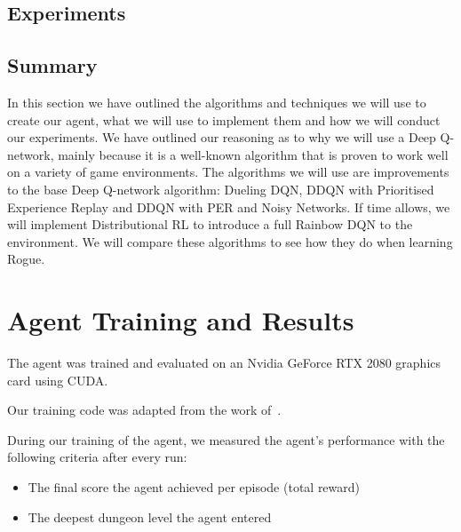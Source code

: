 \documentclass[12pt,a4paper]{article}
\begin{document}
    \subsection{Experiments}\label{subsec:experiments} %


    \subsection{Summary}\label{subsec:summary2}
    In this section we have outlined the algorithms and techniques we will use to create our agent, what we will use to implement them and how we will conduct our experiments.
    We have outlined our reasoning as to why we will use a Deep Q-network, mainly because it is a well-known algorithm that is proven to work well on a variety of game environments.
    The algorithms we will use are improvements to the base Deep Q-network algorithm: Dueling DQN, DDQN with Prioritised Experience Replay and DDQN with PER and Noisy Networks.
    If time allows, we will implement Distributional RL to introduce a full Rainbow DQN to the environment.
    We will compare these algorithms to see how they do when learning Rogue.

    \section{Agent Training and Results}\label{sec:agent-training-and-results}
    The agent was trained and evaluated on an Nvidia GeForce RTX 2080 graphics card using CUDA.

    Our training code was adapted from the work of~\citet{sebtheiler}.

    During our training of the agent, we measured the agent's performance with the following criteria after every run:

    \begin{itemize}
        \item The final score the agent achieved per episode (total reward)
        \item The deepest dungeon level the agent entered
    \end{itemize}
\end{document}
